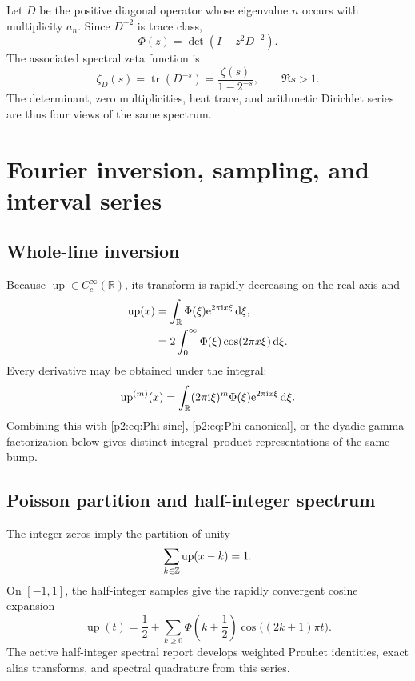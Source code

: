\documentclass[11pt]{article}
\theoremstyle{definition}
\theoremstyle{remark}
\newcommand{\R}{\mathbb R}
\newcommand{\dd}{\,\mathrm d}
\newcommand{\Up}{\operatorname{up}}
\begin{document}
Let $D$ be the positive diagonal operator whose eigenvalue $n$ occurs with multiplicity
$a_n$.  Since $D^{-2}$ is trace class,
\begin{equation}
 \boxed{\quad
 \Phi(z)=\det(I-z^2D^{-2}).
 \quad}                                                  \label{p2:eq:Fredholm}
\end{equation}
The associated spectral zeta function is
\begin{equation}
 \zeta_D(s)=\operatorname{tr}(D^{-s})
 =\frac{\zeta(s)}{1-2^{-s}},\qquad \Re s>1.              \label{p2:eq:spectral-zeta}
\end{equation}
The determinant, zero multiplicities, heat trace, and arithmetic Dirichlet series are thus
four views of the same spectrum.

\section{Fourier inversion, sampling, and interval series}
\label{p2:sec:fourier-inversion}

\subsection{Whole-line inversion}

Because $\Up\in C_c^\infty(\R)$, its transform is rapidly decreasing on the real axis and
\begin{align}
 \Up(x)
 &=\int_{\R}\Phi(\xi)\e^{2\pi\ii x\xi}\dd\xi,           \label{p2:eq:up-inversion}\\
 &=2\int_0^\infty\Phi(\xi)\cos(2\pi x\xi)\dd\xi.       \label{p2:eq:up-cos-integral}
\end{align}
Every derivative may be obtained under the integral:
\begin{equation}
 \Up^{(m)}(x)=\int_{\R}(2\pi\ii\xi)^m
 \Phi(\xi)\e^{2\pi\ii x\xi}\dd\xi.                   \label{p2:eq:up-derivative-Fourier}
\end{equation}
Combining this with \eqref{p2:eq:Phi-sinc}, \eqref{p2:eq:Phi-canonical}, or the dyadic-gamma
factorization below gives distinct integral--product representations of the same bump.

\subsection{Poisson partition and half-integer spectrum}

The integer zeros imply the partition of unity
\begin{equation}
 \sum_{k\in\Z}\Up(x-k)=1.                                \label{p2:eq:partition-unity}
\end{equation}
On $[-1,1]$, the half-integer samples give the rapidly convergent cosine expansion
\begin{equation}
 \boxed{\quad
 \Up(t)=\frac12+\sum_{k\ge0}
 \Phi\left(k+\frac12\right)
 \cos\bigl((2k+1)\pi t\bigr).
 \quad}                                                  \label{p2:eq:up-half-cosine}
\end{equation}
The active half-integer spectral report develops weighted Prouhet identities, exact alias
transforms, and spectral quadrature from this series.
\end{document}
